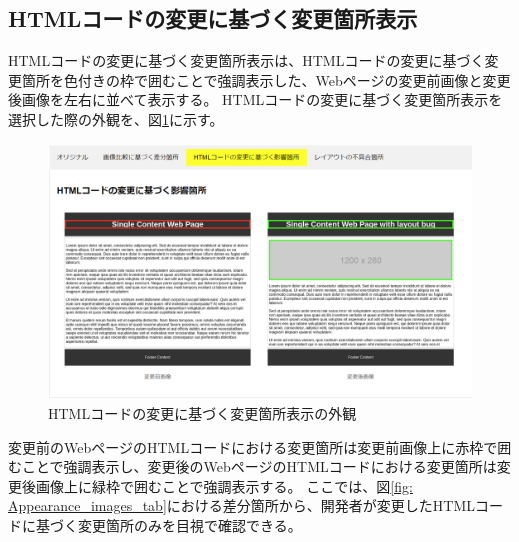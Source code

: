 \subsection{HTMLコードの変更に基づく変更箇所表示}\label{subsec:html_tab}
HTMLコードの変更に基づく変更箇所表示は、HTMLコードの変更に基づく変更箇所を色付きの枠で囲むことで強調表示した、Webページの変更前画像と変更後画像を左右に並べて表示する。
HTMLコードの変更に基づく変更箇所表示を選択した際の外観を、図\ref{fig: Appearance_html_tab}に示す。
\begin{figure}[tp]
      \begin{center}
            \includegraphics[width=1.0\columnwidth]{image/3_html_tab2.png}
            \caption{HTMLコードの変更に基づく変更箇所表示の外観}
            \label{fig: Appearance_html_tab}
      \end{center}
\end{figure}
変更前のWebページのHTMLコードにおける変更箇所は変更前画像上に赤枠で囲むことで強調表示し、変更後のWebページのHTMLコードにおける変更箇所は変更後画像上に緑枠で囲むことで強調表示する。
ここでは、図\ref{fig: Appearance_images_tab}における差分箇所から、開発者が変更したHTMLコードに基づく変更箇所のみを目視で確認できる。

